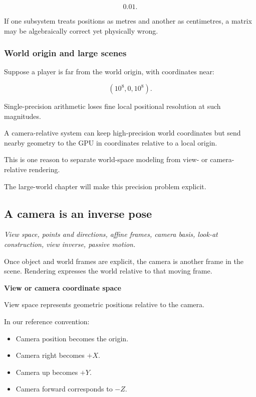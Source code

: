 \[
 0.01.
\]

If one subsystem treats positions as metres and another as centimetres, a matrix may be algebraically correct yet physically wrong.

\subsubsection{World origin and large scenes}\label{02-foundations-ii-ch032-world-origin-and-large-scenes}

\hypertarget{02-foundations-ii-ch032-world-origin-and-large-scenes}{}

Suppose a player is far from the world origin, with coordinates near:

\[
 (10^8,0,10^8).
\]

Single-precision arithmetic loses fine local positional resolution at such magnitudes.

A camera-relative system can keep high-precision world coordinates but send nearby geometry to the GPU in coordinates relative to a local origin.

This is one reason to separate world-space modeling from view- or camera-relative rendering.

The large-world chapter will make this precision problem explicit.

\subsection{A camera is an inverse pose}\label{02-foundations-ii-ch032-a-camera-is-an-inverse-pose}

\hypertarget{02-foundations-ii-ch032-a-camera-is-an-inverse-pose}{}

\emph{View space, points and directions, affine frames, camera basis, look-at construction, view inverse, passive motion.}

Once object and world frames are explicit, the camera is another frame in the scene. Rendering expresses the world relative to that moving frame.

\textbf{View or camera coordinate space}

View space represents geometric positions relative to the camera.

In our reference convention:

\begin{itemize}
\tightlist
\item
  Camera position becomes the origin.
\item
  Camera right becomes \(+X\).
\item
  Camera up becomes \(+Y\).
\item
  Camera forward corresponds to \(-Z\).
\end{itemize}

